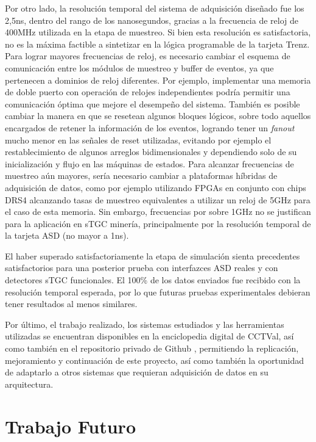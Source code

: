 Por otro lado, la resolución temporal del sistema de adquisición diseñado fue los 2,5ns, dentro del rango de los nanosegundos, gracias a la frecuencia de reloj de 400MHz utilizada en la etapa de muestreo. Si bien esta resolución es satisfactoria, no es la máxima factible a sintetizar en la lógica programable de la tarjeta Trenz. Para lograr mayores frecuencias de reloj, es necesario cambiar el esquema de comunicación entre los módulos de muestreo y buffer de eventos, ya que pertenecen a dominios de reloj diferentes. Por ejemplo, implementar una memoria de doble puerto con operación de relojes independientes podría permitir una comunicación óptima que mejore el desempeño del sistema. También es posible cambiar la manera en que se resetean algunos bloques lógicos, sobre todo aquellos encargados de retener la información de los eventos, logrando tener un \textit{fanout} mucho menor en las señales de reset utilizadas, evitando por ejemplo el restablecimiento de algunos arreglos bidimensionales y dependiendo solo de su inicialización y flujo en las máquinas de estados. Para alcanzar frecuencias de muestreo aún mayores, sería necesario cambiar a plataformas híbridas de adquisición de datos, como por ejemplo utilizando FPGAs en conjunto con chips DRS4\cite{RittDRS4Array} alcanzando tasas de muestreo equivalentes a utilizar un reloj de 5GHz para el caso de esta memoria. Sin embargo, frecuencias por sobre 1GHz no se justifican para la aplicación en sTGC minería, principalmente por la resolución temporal de la tarjeta ASD (no mayor a 1ns).

El haber superado satisfactoriamente la etapa de simulación sienta precedentes satisfactorios para una posterior prueba con interfazces ASD reales y con detectores sTGC funcionales. El 100\% de los datos enviados fue recibido con la resolución temporal esperada, por lo que futuras pruebas experimentales debieran tener resultados al menos similares.

Por último, el trabajo realizado, los sistemas estudiados y las herramientas utilizadas se encuentran disponibles en la enciclopedia digital de CCTVal, así como también en el repositorio privado de Github \cite{GonzalezMuonRepository}, permitiendo la replicación, mejoramiento y continuación de este proyecto, así como también la oportunidad de adaptarlo a otros sistemas que requieran adquisición de datos en su arquitectura.


\section{Trabajo Futuro}

